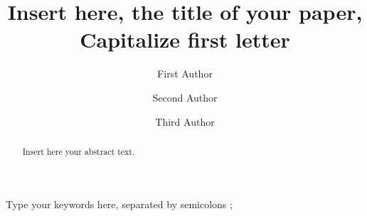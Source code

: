 \documentclass[3p,times,procedia]{elsarticle}
\begin{document}
\begin{frontmatter}



%

\title{Insert here, the title of your paper, Capitalize first letter}




\author[a]{First Author} 
\author[b]{Second Author}
\author[a,b]{Third Author}

\address[a]{First affiliation, Address, City and Postcode, Country}
\address[b]{Second affiliation, Address, City and Postcode, Country}

\begin{abstract}
Insert here your abstract text.
\end{abstract}

\begin{keyword}
Type your keywords here, separated by semicolons ; 




\end{keyword}
\end{frontmatter}
\end{document}
